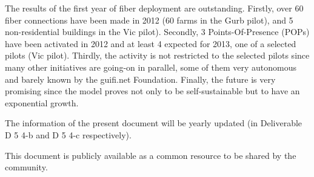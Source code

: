 The results of the first year of fiber deployment are outstanding. Firstly, over 60 fiber connections have been made in 2012 (60 farms in the Gurb pilot), and 5 non-residential buildings in the Vic pilot). Secondly, 3 Points-Of-Presence (POPs) have been activated in 2012 and at least 4 expected for 2013, one of a selected pilots (Vic pilot). Thirdly, the activity is not restricted to the selected pilots since many other initiatives are going-on in parallel, some of them very autonomous and barely known by the guifi.net Foundation. Finally, the future is very promising since the model proves not only to be self-sustainable but to have an exponential growth.

The information of the present document will be yearly updated (in Deliverable D 5 4-b and D 5 4-c respectively).

This document is publicly available as a common resource to be shared by the community.